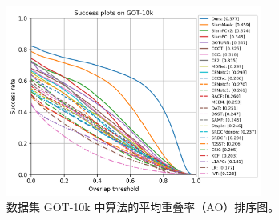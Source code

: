 \begin{figure}[t]
    \centering
    \includegraphics[width=0.75\textwidth]{Img/end/success_plot.png}
    \caption{数据集 GOT-10k \cite{GOT-10k} 中算法的平均重叠率（AO）排序图。}
    \label{fig:end_got10k}
\end{figure}

